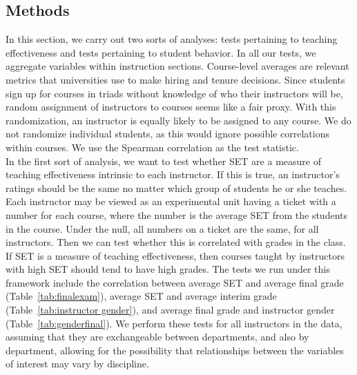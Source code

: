 \documentclass[12pt]{article}
\begin{document}
\subsection{Methods}\label{boring:methods}
In this section, we carry out two sorts of analyses: tests pertaining to teaching effectiveness and tests pertaining to student behavior. In all our tests, we aggregate variables within instruction sections.  Course-level averages are relevant metrics that universities use to make hiring and tenure decisions.  Since students sign up for courses in triads without knowledge of who their instructors will be, random assignment of instructors to courses seems like a fair proxy.  With this randomization, an instructor is equally likely to be assigned to any course.  We do not randomize individual students, as this would ignore possible correlations within courses.  We use the Spearman correlation as the test statistic.  \\

In the first sort of analysis, we want to test whether SET are a measure of teaching effectiveness intrinsic to each instructor.  If this is true, an instructor's ratings should be the same no matter which group of students he or she teaches.  Each instructor may be viewed as an experimental unit having a ticket with a number for each course, where the number is the average SET from the students in the course.  Under the null, all numbers on a ticket are the same, for all instructors.  Then we can test whether this is correlated with grades in the class.  If SET is a measure of teaching effectiveness, then courses taught by instructors with high SET should tend to have high grades.  The tests we run under this framework include the correlation between average SET and average final grade (Table~\ref{tab:finalexam}), average SET and average interim grade (Table~\ref{tab:instructor gender}), and average final grade and instructor gender (Table~\ref{tab:genderfinal}).  We perform these tests for all instructors in the data, assuming that they are exchangeable between departments, and also by department, allowing for the possibility that relationships between the variables of interest may vary by discipline. \\
\end{document}
